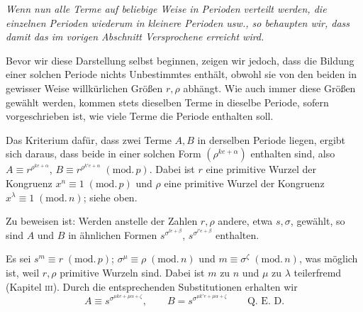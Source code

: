 \emph{Wenn nun alle Terme auf beliebige Weise in Perioden verteilt werden, die einzelnen Perioden wiederum in kleinere Perioden usw., so behaupten wir, dass damit das im vorigen Abschnitt Versprochene erreicht wird.}

Bevor wir diese Darstellung selbst beginnen, zeigen wir jedoch, dass die Bildung einer solchen Periode nichts Unbestimmtes enthält, obwohl sie von den beiden in gewisser Weise willkürlichen Größen $r,\rho$ abhängt. Wie auch immer diese Größen gewählt werden, kommen stets dieselben Terme in dieselbe Periode, sofern vorgeschrieben ist, wie viele Terme die Periode enthalten soll.

Das Kriterium dafür, dass zwei Terme $A,B$ in derselben Periode liegen, ergibt sich daraus, dass beide in einer solchen Form $(\rho^{ke+\alpha})$ enthalten sind, also $A\equiv r^{\rho^{ke+\alpha}}$, $B\equiv r^{\rho^{k'e+\alpha}}\;(\mathrm{mod.}\,p)$. Dabei ist $r$ eine primitive Wurzel der Kongruenz $x^n\equiv1\;(\mathrm{mod.}\,p)$ und $\rho$ eine primitive Wurzel der Kongruenz $x^\lambda\equiv1\;(\mathrm{mod.}\,n)$; siehe oben.

Zu beweisen ist: Werden anstelle der Zahlen $r,\rho$ andere, etwa $s,\sigma$, gewählt, so sind $A$ und $B$ in ähnlichen Formen $s^{\sigma^{le+\beta}}$, $s^{\sigma^{l'e+\beta}}$ enthalten.

Es sei $s^m\equiv r\;(\mathrm{mod.}\,p)$; $\sigma^\mu\equiv\rho\;(\mathrm{mod.}\,n)$ und $m\equiv\sigma^\zeta\;(\mathrm{mod.}\,n)$, was möglich ist, weil $r,\rho$ primitive Wurzeln sind. Dabei ist $m$ zu $n$ und $\mu$ zu $\lambda$ teilerfremd (Kapitel \textsc{iii}). Durch die entsprechenden Substitutionen erhalten wir
\[
A\equiv s^{\sigma^{\mu ke+\mu\alpha+\zeta}},\qquad B=s^{\sigma^{\mu k'e+\mu\alpha+\zeta}}\qquad\text{Q. E. D.}
\]
